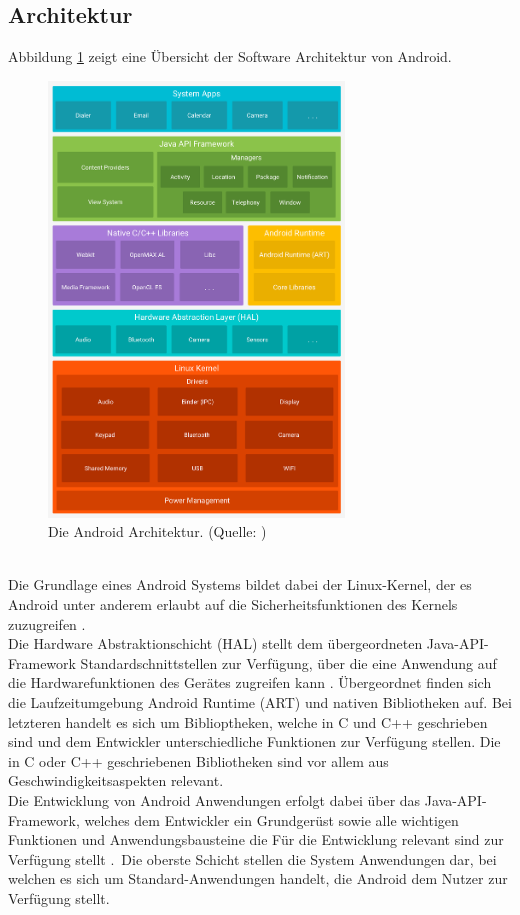 \subsection{Architektur}
Abbildung \ref{fig:android-stack} zeigt eine Übersicht der Software Architektur von Android. 
\begin{figure}[h!]
\centering
\includegraphics[width=0.7\textwidth]{Abbildungen/android-stack.png}
\caption[Android Architektur]{Die Android Architektur. (Quelle: \citet{android:architecture})}
\label{fig:android-stack}
\end{figure}\\
Die Grundlage eines Android Systems bildet dabei der Linux-Kernel, der es Android unter anderem erlaubt auf die Sicherheitsfunktionen des Kernels zuzugreifen \citep{android:architecture}. \\
Die Hardware Abstraktionschicht (HAL) stellt dem übergeordneten Java-API-Framework Standardschnittstellen zur Verfügung, über die eine Anwendung auf die Hardwarefunktionen des Gerätes zugreifen kann \citep{android:architecture}.
Übergeordnet finden sich die Laufzeitumgebung Android Runtime (ART) und nativen Bibliotheken auf. Bei letzteren handelt es sich um Biblioptheken, welche in C und C++ geschrieben sind \citep{android:architecture} und dem Entwickler unterschiedliche Funktionen zur Verfügung stellen. Die in C oder C++ geschriebenen Bibliotheken sind vor allem aus Geschwindigkeitsaspekten relevant. \\
Die Entwicklung von Android Anwendungen erfolgt dabei über das Java-API-Framework, welches dem Entwickler ein Grundgerüst sowie alle wichtigen Funktionen und Anwendungsbausteine die Für die Entwicklung relevant sind zur Verfügung stellt \citep{android:architecture}.\
Die oberste Schicht stellen die System Anwendungen dar, bei welchen es sich um Standard-Anwendungen handelt, die Android dem Nutzer zur Verfügung stellt.

